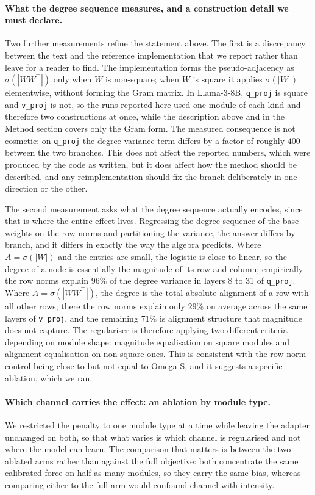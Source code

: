 \documentclass[11pt,a4paper]{article}
\begin{document}
\paragraph{What the degree sequence measures, and a construction detail we
must declare.} Two further measurements refine the statement above. The
first is a discrepancy between the text and the reference implementation that
we report rather than leave for a reader to find. The implementation forms the
pseudo-adjacency as $\sigma(|WW^\top|)$ only when $W$ is non-square; when $W$
is square it applies $\sigma(|W|)$ elementwise, without forming the Gram
matrix. In Llama-3-8B, \texttt{q\_proj} is square and \texttt{v\_proj} is not,
so the runs reported here used one module of each kind and therefore two
constructions at once, while the description above and in the Method section
covers only the Gram form. The measured consequence is not cosmetic: on
\texttt{q\_proj} the degree-variance term differs by a factor of roughly $400$
between the two branches. This does not affect the reported numbers, which
were produced by the code as written, but it does affect how the method should
be described, and any reimplementation should fix the branch deliberately in
one direction or the other.

The second measurement asks what the degree sequence actually encodes, since
that is where the entire effect lives. Regressing the degree sequence of the
base weights on the row norms and partitioning the variance, the answer
differs by branch, and it differs in exactly the way the algebra predicts.
Where $A=\sigma(|W|)$ and the entries are small, the logistic is close to
linear, so the degree of a node is essentially the magnitude of its row and
column; empirically the row norms explain $96\%$ of the degree variance in
layers 8 to 31 of \texttt{q\_proj}. Where $A=\sigma(|WW^\top|)$, the degree is
the total absolute alignment of a row with all other rows; there the row norms
explain only $29\%$ on average across the same layers of \texttt{v\_proj}, and
the remaining $71\%$ is alignment structure that magnitude does not capture.
The regulariser is therefore applying two different criteria depending on
module shape: magnitude equalisation on square modules and alignment
equalisation on non-square ones. This is consistent with the row-norm control
being close to but not equal to Omega-S, and it suggests a specific ablation,
which we ran.

\paragraph{Which channel carries the effect: an ablation by module type.} We
restricted the penalty to one module type at a time while leaving the adapter
unchanged on both, so that what varies is which channel is regularised and not
where the model can learn. The comparison that matters is between the two
ablated arms rather than against the full objective: both concentrate the same
calibrated force on half as many modules, so they carry the same bias, whereas
comparing either to the full arm would confound channel with intensity.
\end{document}
